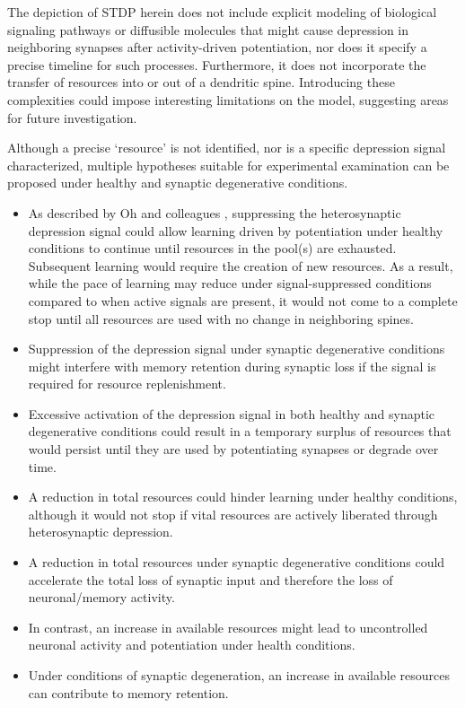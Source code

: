 \documentclass[utf8]{FrontiersinHarvard} %
\begin{document}
The depiction of STDP herein does not include explicit modeling of biological signaling pathways or diffusible molecules that might cause depression in neighboring synapses after activity-driven potentiation, nor does it specify a precise timeline for such processes. Furthermore, it does not incorporate the transfer of resources into or out of a dendritic spine. Introducing these complexities could impose interesting limitations on the model, suggesting areas for future investigation.

Although a precise `resource' is not identified, nor is a specific depression signal characterized, multiple hypotheses suitable for experimental examination can be proposed under healthy and synaptic degenerative conditions.

\begin{itemize}
    \item As described by Oh and colleagues \citeyearpar{Oh.2015}, suppressing the heterosynaptic depression signal could allow learning driven by potentiation under healthy conditions to continue until resources in the pool(s) are exhausted. Subsequent learning would require the creation of new resources. As a result, while the pace of learning may reduce under signal-suppressed conditions compared to when active signals are present, it would not come to a complete stop until all resources are used with no change in neighboring spines. 
    
    \item Suppression of the depression signal under synaptic degenerative conditions might interfere with memory retention during synaptic loss if the signal is required for resource replenishment.
    
    \item Excessive activation of the depression signal in both healthy and synaptic degenerative conditions could result in a temporary surplus of resources that would persist until they are used by potentiating synapses or degrade over time.
    
    \item A reduction in total resources could hinder learning under healthy conditions, although it would not stop if vital resources are actively liberated through heterosynaptic depression.

    \item A reduction in total resources under synaptic degenerative conditions could accelerate the total loss of synaptic input and therefore the loss of neuronal/memory activity.

    \item In contrast, an increase in available resources might lead to uncontrolled neuronal activity and potentiation under health conditions.
    
    \item Under conditions of synaptic degeneration, an increase in available resources can contribute to memory retention.
\end{itemize}
\end{document}
